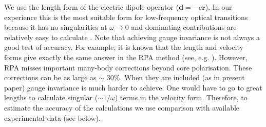 \documentclass[10pt,a4paper, twoside]{report}
\begin{document}
\iffalse

 We use the length form of the electric dipole operator ($\mathbf{d} = -e\mathbf{r}$). In our experience this is the most suitable form for low-frequency optical transitions because it has no singularities at $\omega \rightarrow 0$ and dominating contributions are relatively easy to calculate \cite{DFSS1987_2, DFSS1987}. Note that achieving gauge invariance is not always a good test of accuracy. For example, it is known that the length and velocity forms give exactly the same answer in the RPA method (see, e.g. \cite{DzuFlaSilSus87, DFSS1986}). However, RPA misses important many-body corrections beyond core polarisation. These corrections can be as large as $\sim$ 30\%. When they are included (as in present paper) gauge invariance is much harder to achieve. One would have to go to great lengths to calculate singular ($\sim 1/\omega$) terms in the velocity form. Therefore, to estimate the accuracy of the calculations we use comparison with available experimental data (see below).\\
\end{document}

